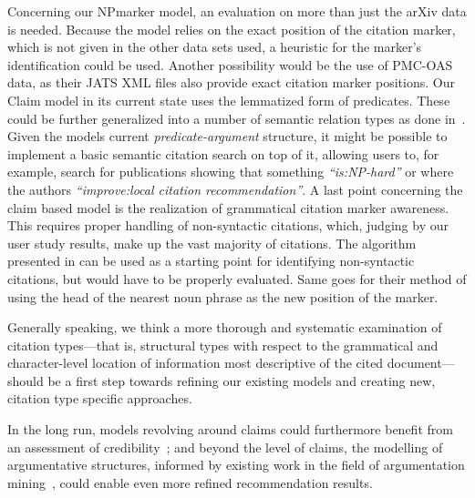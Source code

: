 Concerning our NPmarker model, an evaluation on more than just the arXiv data is needed. Because the model relies on the exact position of the citation marker, which is not given in the other data sets used, a heuristic for the marker's identification could be used. Another possibility would be the use of PMC-OAS data, as their JATS XML files also provide exact citation marker positions. Our Claim model in its current state uses the lemmatized form of predicates. These could be further generalized into a number of semantic relation types as done in~\cite{Gabor2018}. Given the models current \emph{predicate-argument} structure, it might be possible to implement a basic semantic citation search on top of it, allowing users to, for example, search for publications showing that something \emph{``is:NP-hard''} or where the authors \emph{``improve:local citation recommendation''}. A last point concerning the claim based model is the realization of grammatical citation marker awareness. This requires proper handling of non-syntactic citations, which, judging by our user study results, make up the vast majority of citations. The algorithm presented in \cite{Abujbara2012} can be used as a starting point for identifying non-syntactic citations, but would have to be properly evaluated. Same goes for their method of using the head of the nearest noun phrase as the new position of the marker.

Generally speaking, we think a more thorough and systematic examination of citation types---that is, structural types with respect to the grammatical and character-level location of information most descriptive of the cited document---should be a first step towards refining our existing models and creating new, citation type specific approaches.

In the long run, models revolving around claims could furthermore benefit from an assessment of credibility~\cite{Popat2016}; and beyond the level of claims, the modelling of argumentative structures, informed by existing work in the field of argumentation mining~\cite{Stab2016,Lippi2016,Habernal2017}, could enable even more refined recommendation results.
